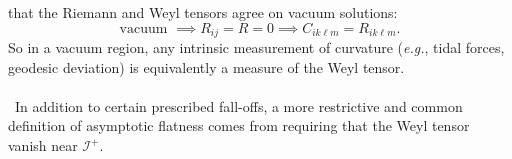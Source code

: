 \documentclass[11pt,letterpaper]{article}
\begin{document}
that the Riemann and Weyl tensors agree on vacuum solutions: \begin{equation}
\mbox{vacuum } \implies R_{ij} = R = 0 \implies C_{i k \ell m} = R_{i k \ell m}.
\end{equation}
So in a vacuum region, any intrinsic measurement of curvature (\textit{e.g.}, tidal forces, geodesic deviation) is equivalently a measure of the Weyl tensor. \\
\\
\
In addition to certain prescribed fall-offs, a more restrictive and common definition of asymptotic flatness comes from requiring that the Weyl tensor vanish near $\mathcal{I}^+$.



\end{document}
